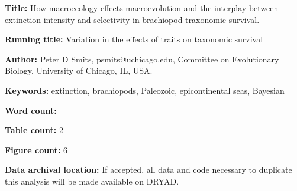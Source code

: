 \documentclass{article}
\begin{document}
\linenumbers
\modulolinenumbers[2]


\begin{titlepage}
  \begin{large}
    \textbf{Title:} How macroecology effects macroevolution and the interplay between extinction intensity and selectivity in brachiopod traxonomic survival.
  \end{large}

  \textbf{Running title:} Variation in the effects of traits on taxonomic survival

  \textbf{Author:} Peter D Smits, psmits@uchicago.edu, Committee on Evolutionary Biology, University of Chicago, IL, USA.

  \textbf{Keywords:} extinction, brachiopods, Paleozoic, epicontinental seas, Bayesian

  \textbf{Word count:} 
  
  \textbf{Table count:} 2
 
  \textbf{Figure count:} 6

  \textbf{Data archival location:} If accepted, all data and code necessary to duplicate this analysis will be made available on DRYAD.

\end{titlepage}
\end{document}
